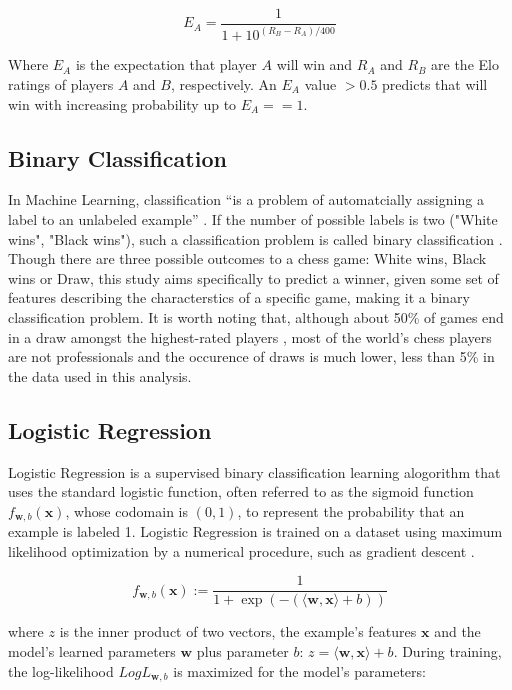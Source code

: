 \documentclass[12pt]{article}
\begin{document}
\[
E_A = \frac{1}{1 + 10^{(R_B - R_A)/400}}
\]

Where $E_A$ is the expectation that player $A$ will win and $R_A$ and $R_B$ are the Elo ratings of players $A$ and $B$, respectively. An $E_A$ value $> 0.5$ predicts that will win with increasing probability up to $E_A == 1$.

\subsection{Binary Classification}

In Machine Learning, classification ``is a problem of automatcially assigning a label to an unlabeled example'' \cite[Chapter 2, Section 2.7]{100MLB}. If the number of possible labels is two ("White wins", "Black wins"), such a classification problem is called binary classification \cite{Allwein2000}. Though there are three possible outcomes to a chess game: White wins, Black wins or Draw, this study aims specifically to predict a winner, given some set of features describing the characterstics of a specific game, making it a binary classification problem. It is worth noting that, although about 50\% of games end in a draw amongst the highest-rated players \cite{chessBaseDraws}, most of the world's chess players are not professionals and the occurence of draws is much lower, less than 5\% in the data used in this analysis.

\subsection{Logistic Regression}

Logistic Regression is a supervised binary classification learning alogorithm that uses the standard logistic function, often referred to as the sigmoid function $f_{\textbf{w},b}(\textbf{x})$, whose codomain is $(0, 1)$, to represent the probability that an example is labeled 1. Logistic Regression is trained on a dataset using maximum likelihood optimization by a numerical procedure, such as gradient descent \cite[Chapter 9, Section 9.3]{ShalevShwartz2014}.

\[
f_{\textbf{w},b}(\textbf{x}) := \frac{1}{1 + \exp(-(\langle\textbf{w}, \textbf{x}\rangle + b))}
\]

where $z$ is the inner product of two vectors, the example's features $\textbf{x}$ and the model's learned parameters $\textbf{w}$ plus parameter $b$: $z = \langle\textbf{w}, \textbf{x}\rangle + b$. During training, the log-likelihood $LogL_{\textbf{w},b}$ is maximized for the model's parameters:
\end{document}
